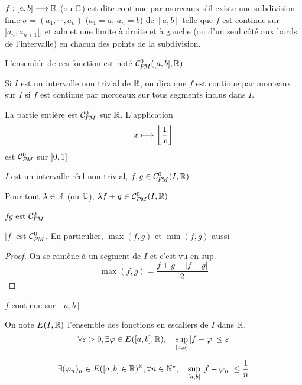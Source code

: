 \begin{dfn}[Rappel]
    $f:[a, b]\longrightarrow\mathbb R$ (ou $\mathbb C$) est dite continue par morceaux s'il existe une subdivision finie $\sigma=(a_1, \cdots, a_n)$ ($a_1=a$, $a_n=b$) de $[a, b]$ telle que $f$ est continue sur $]a_n, a_{n+1}[$, et admet une limite à droite et à gauche (ou d'un seul côté aux bords de l'intervalle) en chacun des points de la subdivision.

    L'ensemble de ces fonction est noté $\CPM([a, b], \R)$
\end{dfn}

\begin{dfn}
    Si $I$ est un intervalle non trivial de $\mathbb R$, on dira que $f$ est continue par morceaux sur $I$ si $f$ est continue par morceaux sur tous segments inclus dans $I$.
\end{dfn}

\begin{ex}
    La partie entière est $\CPM$ sur $\mathbb R$. L'application \[
        x\longmapsto \left\lfloor\frac1x\right\rfloor
    \]
    est $\CPM$ sur $]0, 1]$
\end{ex}

\begin{prop}
    \Hyp $I$ est un intervalle réel non trivial, $f,g\in \CPM(I, \R)$
    \begin{concenum}
    \item Pour tout $\lambda\in\mathbb R$ (ou $\mathbb C$), $\lambda f+g\in\CPM(I, \R)$
    \item $fg$ est $\CPM$
    \item $|f|$ est $\CPM$. En particulier, $\max (f,g)$ et $\min (f,g)$ aussi
    \end{concenum}
\end{prop}

\begin{proof}
    On se ramène à un segment de $I$ et c'est vu en sup. \[
        \max(f,g)=\frac{f+g+|f-g|}2
    \]
\end{proof}

\begin{thm}[Rappel]
    \Hyp $f$ continue sur $[a,b]$
   \begin{concenum}
   \item  On note $E(I, \mathbb R)$ l'ensemble des fonctions en escaliers de $I$ dans $\mathbb R$. \[
           \forall \varepsilon>0, \exists \varphi\in E([a, b], \mathbb R), \quad \sup_{[a, b]}|f-\varphi|\leq \varepsilon
       \]
   \item \[
        \exists (\varphi_n)_n\in E([a,b]\in\mathbb R)^{\mathbb R}, \forall n\in\mathbb N^\star, \quad \sup_{[a,b]}|f-\varphi_n|\leq\frac1n
       \]
   \end{concenum}
\end{thm}

